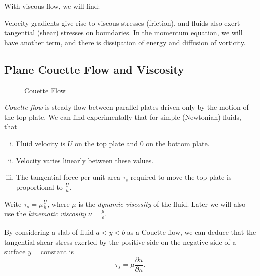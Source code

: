 \documentclass[12pt]{article}
\begin{document}
With viscous flow, we will find:

Velocity gradients give rise to viscous stresses (friction), and fluids also exert tangential (shear) stresses on boundaries. In the momentum equation, we will have another term, and there is dissipation of energy and diffusion of vorticity.

\subsection{Plane Couette Flow and Viscosity}
\label{sub:plane_couette_flow_and_viscosity}

\begin{figure}[h]
	\centering
	\caption{Couette Flow}
	\label{fig:couette_flow}
\end{figure}

\emph{Couette flow} is steady flow between parallel plates driven only by the motion of the top plate. We can find experimentally that for simple (Newtonian) fluids, that
\begin{enumerate}[(i)]
	\item Fluid velocity is $U$ on the top plate and $0$ on the bottom plate.
	\item Velocity varies linearly between these values.
	\item The tangential force per unit area $\tau_s$ required to move the top plate is proportional to $\frac{U}{h}$.
\end{enumerate}

Write $\tau_s = \mu \frac{U}{h}$, where $\mu$ is the \emph{dynamic viscosity} of the fluid. Later we will also use the \emph{kinematic viscosity} $\nu = \frac{\mu}{\rho}$.

By considering a slab of fluid $a < y < b$ as a Couette flow, we can deduce that the tangential shear stress exerted by the positive side on the negative side of a surface $y = \mathrm{constant}$ is
\[
	\tau_s = \mu \frac{\partial u}{\partial n}
.\]
\end{document}
